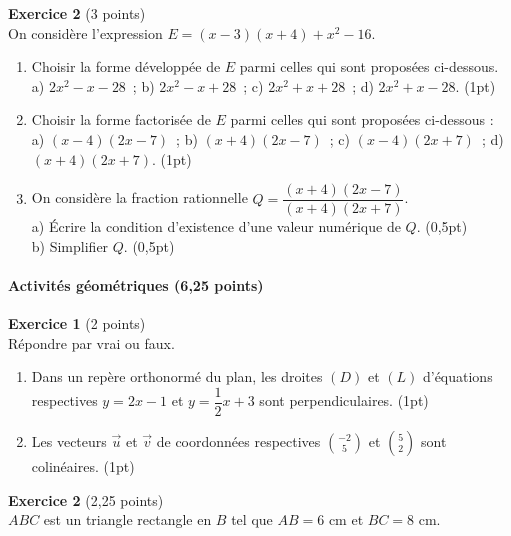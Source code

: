 \textbf{Exercice 2} (3 points) \\
On considère l'expression $E=(x-3)(x+4)+x^{2}-16$.
\begin{enumerate}[label=\arabic*)]
\item Choisir la forme développée de $E$ parmi celles qui sont proposées ci-dessous. \\
a) $2x^{2}-x-28$~; \quad b) $2x^{2}-x+28$~; \quad c) $2x^{2}+x+28$~; \quad d) $2x^{2}+x-28$.
\hfill (1pt)
\item Choisir la forme factorisée de $E$ parmi celles qui sont proposées ci-dessous : \\
a) $(x-4)(2x-7)$~; \quad b) $(x+4)(2x-7)$~; \quad c) $(x-4)(2x+7)$~; \quad d)
$(x+4)(2x+7)$. \hfill (1pt)
\item[3)] On considère la fraction rationnelle $Q=\dfrac{(x+4)(2x-7)}{(x+4)(2x+7)}$. \\
a) Écrire la condition d'existence d'une valeur numérique de $Q$. \hfill (0,5pt) \\
b) Simplifier $Q$. \hfill (0,5pt)
\end{enumerate}

\paragraph{Activités géométriques (6,25 points)}

\textbf{Exercice 1} (2 points) \\
Répondre par vrai ou faux.
\begin{enumerate}[label=\arabic*)]
\item Dans un repère orthonormé du plan, les droites $(D)$ et $(L)$ d'équations
respectives $y=2x-1$ et $y=\dfrac12x+3$ sont perpendiculaires. \hfill (1pt)
\item Les vecteurs $\vec u$ et $\vec v$ de coordonnées respectives $\binom{-2}{5}$ et
$\binom52$ sont colinéaires. \hfill (1pt)
\end{enumerate}

\textbf{Exercice 2} (2,25 points) \\
$ABC$ est un triangle rectangle en $B$ tel que $AB=6$ cm et $BC=8$ cm.

\begin{illus}
\end{illus}

